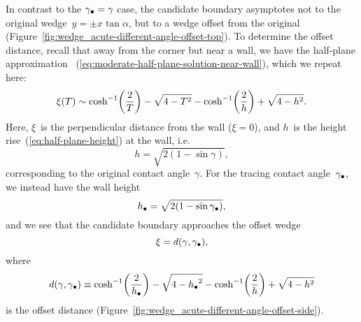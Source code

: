 In contrast to the $\gamma_\bullet = \gamma$ case,
the candidate boundary asymptotes
not to the original wedge~$y = \pm x \tan\alpha$,
but to a wedge offset from the original
(Figure~\ref{fig:wedge_acute-different-angle-offset-top}).
To determine the offset distance,
recall that away from the corner but near a wall,
we have the half-plane approximation~%
  (\ref{eq:moderate-half-plane-solution-near-wall}),
which we repeat here:
\begin{equation}
  \xi (T) \asy
    \cosh^{-1} \roundbr*{\frac{2}{T}} - \sqrt{4 - T^2}
    - \cosh^{-1} \roundbr*{\frac{2}{h}} + \sqrt{4 - h^2}.
    \label{eq:moderate-half-plane-solution-near-wall-repeat}
\end{equation}
Here, $\xi$~is the perpendicular distance from the wall ($\xi = 0$),
and $h$~is the height rise~(\ref{eq:half-plane-height}) at the wall,
i.e.
\begin{equation}
  h = \sqrt{2 (1 - \sin\gamma)},
  \label{eq:half-plane-height-repeat}
\end{equation}
corresponding to the original contact angle~$\gamma$.
For the tracing contact angle~$\gamma_\bullet$,
we instead have the wall height
\begin{equation}
  h_\bullet = \sqrt{2 (1 - \sin\gamma_\bullet)},
  \label{eq:half-plane-height-different-angle}
\end{equation}
and we see that the candidate boundary approaches the offset wedge
\begin{equation}
  \xi = d (\gamma, \gamma_\bullet),
  \label{eq:moderate-offset-wedge}
\end{equation}
where
\begin{equation}
  d (\gamma, \gamma_\tr) \ideq
    \cosh^{-1} \roundbr*{\frac{2}{h_\tr}} - \sqrt{4 - {h_\tr}^2}
    - \cosh^{-1} \roundbr*{\frac{2}{h}} + \sqrt{4 - h^2}
  \label{eq:moderate-offset-distance}
\end{equation}
is the offset distance
(Figure~\ref{fig:wedge_acute-different-angle-offset-side}).

\begin{figure}
\end{figure}

